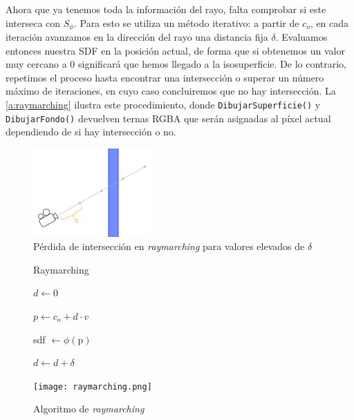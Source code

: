 Ahora que ya tenemos toda la información del rayo, falta comprobar si este interseca con $S_{\phi}$. Para esto se utiliza un método iterativo: a partir de $c_o$, en cada iteración avanzamos en la dirección del rayo una distancia fija $\delta$. Evaluamos entonces nuestra SDF en la posición actual, de forma que si obtenemos un valor muy cercano a $0$ significará que hemos llegado a la isosuperficie. De lo contrario, repetimos el proceso hasta encontrar una intersección o superar un número máximo de iteraciones, en cuyo caso concluiremos que no hay intersección. La \autoref{a:raymarching} ilustra este procedimiento, donde \texttt{DibujarSuperficie()} y \texttt{DibujarFondo()} devuelven ternas RGBA que serán asignadas al píxel actual dependiendo de si hay intersección o no.\newline

\begin{figure}[ht!]
    \centering
    \includegraphics[width=0.4\textwidth]{Plantilla-TFG-master/img/miss.png}
    \caption{Pérdida de intersección en \textit{raymarching} para valores elevados de $\delta$}
    \label{fig:miss}
\end{figure}

\begin{figure}[ht!]
    \centering
    \begin{minipage}{0.58\textwidth}
        \begin{algorithm}[H]
            \caption{Raymarching}
                
                $d \gets 0$ 
                
                 {
                    $p \gets c_o +d\cdot v$
                    
                    sdf $\gets \phi(\text{p})$
                    
            
                    $d\gets d + \delta$\;
            
                }
        \end{algorithm}
    \end{minipage}%
    \hfill
    \begin{minipage}{0.4\textwidth}
        \texttt{[image: raymarching.png]}
    \end{minipage}
    \caption{Algoritmo de \textit{raymarching}}
    \label{a:raymarching}
\end{figure}

